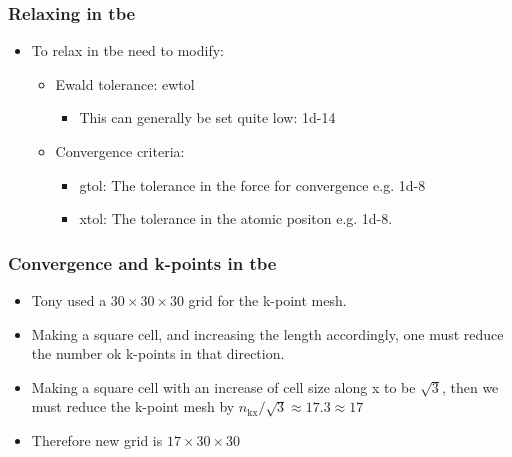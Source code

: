 \documentclass[11pt]{article}
\begin{document}
\subsubsection{Relaxing in tbe}
\label{sec:org910708d}
\begin{itemize}
\item To relax in tbe need to modify:
\begin{itemize}
\item Ewald tolerance: ewtol
\begin{itemize}
\item This can generally be set quite low: 1d-14
\end{itemize}
\item Convergence criteria:
\begin{itemize}
\item gtol: The tolerance in the force for convergence e.g. 1d-8
\item xtol: The tolerance in the atomic positon e.g. 1d-8.
\end{itemize}
\end{itemize}
\end{itemize}

\subsubsection{Convergence and k-points in tbe}
\label{sec:orgf4b708f}
\begin{itemize}
\item Tony used a \(30\times 30\times 30\) grid for the k-point mesh.
\item Making a square cell, and increasing the length accordingly, one must
reduce the number ok k-points in that direction.
\item Making a square cell with an increase of cell size along x to be
\(\sqrt{3}\), then we must reduce the k-point mesh by \(n_{\text{kx}} /
      \sqrt{3} \approx 17.3 \approx 17\)
\item Therefore new grid is \(17 \times 30 \times 30\)
\end{itemize}
\end{document}
